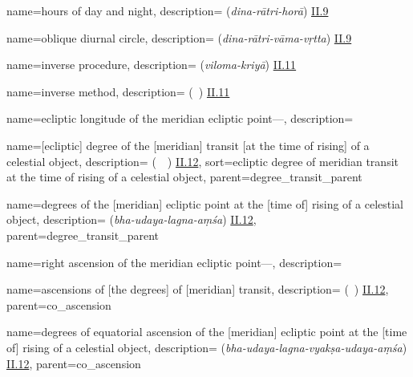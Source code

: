 {
        name={hours of day and night},
        description={ (\textit{dina-rātri-horā}) \hyperlink{Sii9}{II.9}}
}

{
        name={oblique diurnal circle},
        description={ (\textit{dina-rātri-vāma-vṛtta}) \hyperlink{Sii9}{II.9}}
}


{
        name={inverse procedure},
        description={ (\textit{viloma-kriyā}) \hyperlink{Sii11}{II.11}}
}

{
        name={inverse method},
        description={ (\amal\idafaconsonant\ \aks) \hyperlink{Pii11}{II.11}}
}

{
        name={ecliptic longitude of the meridian ecliptic point---},
        description={\phantom{x}\nopagebreak}
}

{       name={[ecliptic] degree of the [meridian] transit [at the time of rising] of a celestial object},
        description={ (\daraji\idafavowel\ \mamarr\idafaconsonant\ \kawkab) \hyperlink{Pii12}{II.12}},
        sort={ecliptic degree of meridian transit at the time of rising of a celestial object},
        parent={degree_transit_parent}
}

{       name={degrees of the [meridian] ecliptic point at the [time of] rising of a celestial object},
        description={ (\textit{bha-udaya-lagna-aṃśa}) \hyperlink{Sii12}{II.12}},
        parent={degree_transit_parent}
}        

{
        name={right ascension of the meridian ecliptic point---},
        description={\phantom{x}\nopagebreak}
}

{
        name={ascensions of [the degrees] of [meridian] transit},
        description={ (\matali\idafaconsonant\ \mamarr) \hyperlink{Pii12}{II.12}},
        parent={co_ascension}
}

{
        name={degrees of equatorial ascension of the [meridian] ecliptic point at the [time of] rising of a celestial object},
        description={ (\textit{bha-udaya-lagna-vyakṣa-udaya-aṃśa}) \hyperlink{Sii12}{II.12}},
        parent={co_ascension}
}


